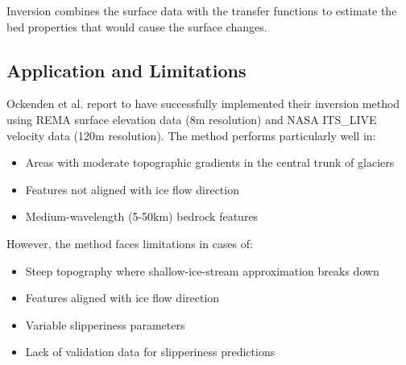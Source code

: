 Inversion combines the surface data with the transfer functions to estimate the bed properties that would cause the surface changes.

\subsection*{Application and Limitations}

Ockenden et al. report to have successfully implemented their inversion method using REMA surface elevation data (8m resolution) and NASA ITS\_LIVE velocity data (120m resolution). The method performs particularly well in:
\begin{itemize}
\item Areas with moderate topographic gradients in the central trunk of glaciers
\item Features not aligned with ice flow direction
\item Medium-wavelength (5-50km) bedrock features
\end{itemize}
However, the method faces limitations in cases of:
\begin{itemize}
\item Steep topography where shallow-ice-stream approximation breaks down
\item Features aligned with ice flow direction
\item Variable slipperiness parameters
\item Lack of validation data for slipperiness predictions
\end{itemize}


